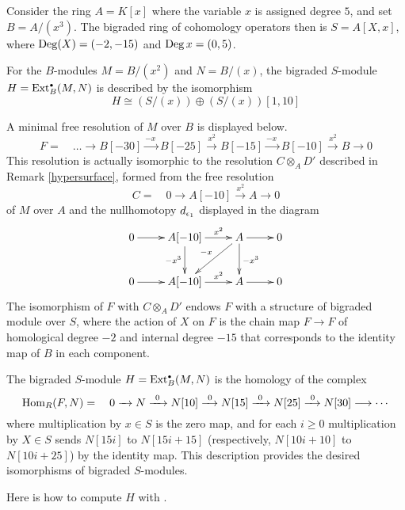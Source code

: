 \begin{Example}
Consider the ring $A = K[x]$ where the variable $x$ is assigned degree
$5$, and set $B = A/(x^3)$.  The bigraded ring of cohomology operators
then is $S=A[X,x]$, where $\operatorname{Deg}(X)=(-2,-15)$ and $\operatorname{Deg} x=(0,5)$.

For the $B$-modules $M = B/(x^2)$ and $N = B/(x)$, the bigraded
$S$-module $H=\operatorname{Ext}^{\scriptscriptstyle\bullet}_B(M,N)$ is described by the isomorphism
\[
   H\cong (S/(x))\oplus (S/(x))[1,10]
\]

A minimal free resolution of $M$ over $B$ is displayed below.
\[
F = \quad \dots \longrightarrow
 B[-30] \xrightarrow{-x\,} B[-25] \xrightarrow{\ x^2\,} 
 B[-15] \xrightarrow{-x\,} B[-10] \xrightarrow{\ x^2\,} 
 B \longrightarrow 0
\] 
This resolution is actually isomorphic to the resolution $C\otimes_A
D'$ described in Remark \ref{hypersurface}, formed from the free
resolution
\[C
= \quad 0 \longrightarrow A[-10] \xrightarrow{\ x^2\,} A
\longrightarrow 0
\]
of $M$ over $A$ and the nullhomotopy $d_{\epsilon_1}$ displayed in the diagram
\[
\xymatrix{
0 \ar[r] & A[-10] \ar[r]^-{x^2} \ar[d]_{-x^3} & A \ar[r] \ar[d]^{-x^3}
        \ar[dl]_-{-x} & 0 \\
0 \ar[r] & A[-10] \ar[r]^-{x^2}              & A \ar[r]                              & 0
}
\]
The isomorphism of $F$ with $C \otimes_A D'$ endows $F$ with a
structure of bigraded module over $S$, where the action of $X$ on
$F$ is the chain map $F \to F$ of homological degree $-2$ and internal
degree $-15$ that corresponds to the identity map of $B$ in each
component.

The bigraded $S$-module $H=\operatorname{Ext}^{\scriptscriptstyle\bullet}_B(M,N)$ is the homology of the
complex
\[
\operatorname{Hom}_R(F,N) = \quad 0 \xrightarrow{\ \ }
N \xrightarrow{\ 0\ } N[10] \xrightarrow{\ 0\,}
N[15] \xrightarrow{\ 0\ } N[25] \xrightarrow{\ 0\,} 
N[30] \longrightarrow\cdots
\]
where multiplication by $x\in S$ is the zero map, and for each $i\ge0$
multiplication by $X\in S$ sends $N[15i]$ to $N[15i+15]$
(respectively, $N[10i+10]$ to $N[10i+25]$) by the identity map.  This
description provides the desired isomorphisms of bigraded $S$-modules.

Here is how to compute $H$ with \Mtwo.
 

\end{Example}
